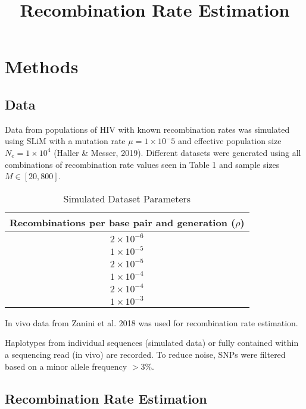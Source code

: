 \documentclass[12pt]{article}
\begin{document}
\title{Recombination Rate Estimation}
\maketitle
\section*{Methods}
\subsection*{Data}
    Data from populations of HIV with known recombination rates was simulated using SLiM with a mutation rate $\mu = 1 \times10^-5$ and effective population size $N_e = 1 \times 10^4$ (Haller \& Messer, 2019). Different datasets were generated using all combinations of recombination rate values seen in Table 1 and sample sizes $M \in [20, 800]$.
\begin{table}[htb]
\caption{Simulated Dataset Parameters}
\centering
\begin{tabular}{c}
\noalign{\smallskip} \hline \hline \noalign{\smallskip}
Recombinations per base pair and generation ($\rho$) \\
\hline
$2 \times 10^{-6}$ \\
$1 \times 10^{-5}$ \\
$2 \times 10^{-5}$ \\
$1 \times 10^{-4}$ \\
$2 \times 10^{-4}$ \\
$1 \times 10^{-3}$ \\
\end{tabular}
\centering
\end{table}

    In vivo data from Zanini et al. 2018 was used for recombination rate estimation.



    Haplotypes from individual sequences (simulated data) or fully contained within a sequencing read (in vivo) are recorded. To reduce noise, SNPs were filtered based on a minor allele frequency $>3\%$.

\subsection*{Recombination Rate Estimation}
\end{document}

